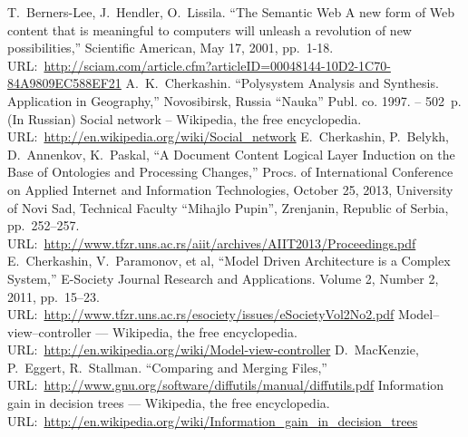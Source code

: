 \documentclass[conference]{IEEEtran}
\begin{document}
%
%
%
\vspace{1.4em} %
\begin{thebibliography}{11}
 T.~Berners-Lee, J.~Hendler, O.~Lissila. ``The
  Semantic Web A new form of Web content that is meaningful to
  computers will unleash a revolution of new possibilities,''
  Scientific American, May 17, 2001,
  pp.~1-18. URL:~\url{http://sciam.com/article.cfm?articleID=00048144-10D2-1C70-84A9809EC588EF21}
 A.~K.~Cherkashin. ``Polysystem Analysis and
  Synthesis. Application in Geography,'' Novosibirsk, Russia ``Nauka'' Publ. co.
  1997. -- 502~p. (In Russian)
 Social network -- Wikipedia, the free encyclopedia.
  URL:~\url{http://en.wikipedia.org/wiki/Social_network}
 E.~Cherkashin, P.~Belykh, D.~Annenkov, K.~Paskal, ``A
  Document Content Logical Layer Induction on the Base of Ontologies
  and Processing Changes,'' Procs. of International Conference on
  Applied Internet and Information Technologies, October 25, 2013,
  University of Novi Sad, Technical Faculty ``Mihajlo Pupin'',
  Zrenjanin, Republic of Serbia,
  pp.~252--257. URL:~\url{http://www.tfzr.uns.ac.rs/aiit/archives/AIIT2013/Proceedings.pdf}
 E.~Cherkashin, V.~Paramonov, et al, ``Model Driven
  Architecture is a Complex System,'' E-Society Journal Research and
  Applications. Volume 2, Number 2, 2011, pp.~15--23.
  URL:~\url{http://www.tfzr.uns.ac.rs/esociety/issues/eSocietyVol2No2.pdf}
 Model--view--controller --- Wikipedia, the free
  encyclopedia.
  URL:~\url{http://en.wikipedia.org/wiki/Model-view-controller}
 D.~MacKenzie, P.~Eggert, R.~Stallman. ``Comparing and
  Merging Files,''
  URL:~\url{http://www.gnu.org/software/diffutils/manual/diffutils.pdf}
 Information gain in decision trees ---  Wikipedia, the free
  encyclopedia. URL:~\url{http://en.wikipedia.org/wiki/Information_gain_in_decision_trees}

\end{thebibliography}
\end{document}
